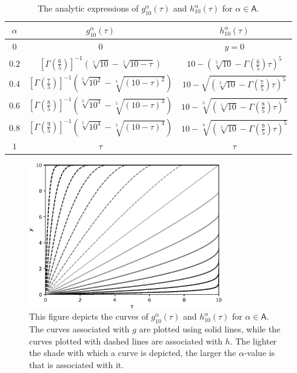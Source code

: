\documentclass{article}
\theoremstyle{theorem}
\theoremstyle{definition}
\begin{document}
\begin{table}[h!]
 \centering
 \caption{The analytic expressions of $g_{10}^{\alpha}(\tau)$ and $h_{10}^{\alpha}(\tau)$ for $\alpha\in\mathsf{A}$.}
 \label{tab:gandh}
 \begin{tabular}{|c || c | c|} 
 \hline
 $\alpha$ & $g_{10}^{\alpha}(\tau)$ & $h_{10}^{\alpha}(\tau)$ \\ [0.5ex] 
 \hline\hline
 $0$ & 0 & $y=0$ \\ 
 $0.2$ & $[\Gamma\left (\frac{6}{5} \right )]^{-1}\left(\sqrt[5]{10}-\sqrt[5]{10-\tau}\right)$ & $10 - \left ( \sqrt[5]{10} -  \Gamma\left (\frac{6}{5} \right ) \tau \right )^5$  \\
 $0.4$ & $[\Gamma\left (\frac{7}{5} \right )]^{-1}\left(\sqrt[5]{10^2}-\sqrt[5]{(10-\tau)^2}\right)$ & $10 - \sqrt{\left ( \sqrt[5]{10} -  \Gamma\left (\frac{7}{5} \right ) \tau \right )^5}$ \\
 $0.6$ & $[\Gamma\left (\frac{8}{5} \right )]^{-1}\left(\sqrt[5]{10^3}-\sqrt[5]{(10-\tau)^3}\right)$ & $10 - \sqrt[3]{\left ( \sqrt[5]{10} -  \Gamma\left (\frac{8}{5} \right ) \tau \right )^5}$ \\
 $0.8$ & $[\Gamma\left (\frac{9}{5} \right )]^{-1}\left(\sqrt[5]{10^4}-\sqrt[5]{(10-\tau)^4}\right)$ & $10 - \sqrt[4]{\left ( \sqrt[5]{10} -  \Gamma\left (\frac{9}{5} \right ) \tau \right )^5}$ \\ [1ex] 
 $1$ & $\tau$ & $\tau$ \\ [1ex] 
 \hline
 \end{tabular}
 \end{table}

\begin{figure}[htb]
\centering
\includegraphics[width=0.75\textwidth]{gh.eps}
\caption{This figure depicts the curves of $g_{10}^{\alpha}(\tau)$ and $h_{10}^{\alpha}(\tau)$ for $\alpha\in\mathsf{A}$. The curves associated with $g$ are plotted using 
solid lines, while the curves plotted with dashed lines are associated with $h$. The lighter the shade with which a curve is depicted, the larger the $\alpha$-value is that is associated with it.
}
\label{fig:gandh}
\end{figure}
\end{document}
